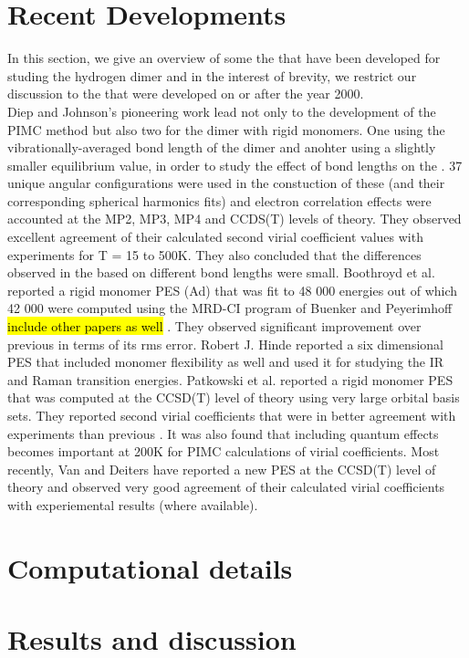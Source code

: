     \section{Recent Developments}
        In this section, we give an overview of some the \abInitio{} \PESs{} that have been developed for studing the hydrogen dimer and in the interest of brevity, we restrict our discussion to the \PESs{} that were developed on or after the year 2000.\\
 
        Diep and Johnson's \cite{Diep2000} pioneering work lead not only to the development of the PIMC method but also two \abInitio{} \PESs{} for the dimer with rigid monomers. One using the vibrationally-averaged bond length of the dimer and anohter using a slightly smaller equilibrium value, in order to study the effect of bond lengths on the \PESs{}. 37 unique angular configurations were used in the constuction of these \PESs{} (and their corresponding spherical harmonics fits) and electron correlation effects were accounted at the MP2, MP3, MP4 and CCDS(T) levels of theory. They observed excellent agreement of their calculated second virial coefficient values with experiments for T = 15 to 500K. They also concluded that the differences observed in the \PESs{} based on different bond lengths were small. Boothroyd et al. \cite{Boothroyd2002} reported a rigid monomer PES (Ad) that was fit to \Sim{} 48 000 \abInitio{} energies out of which \Sim{} 42 000 were computed using the MRD-CI program of Buenker and Peyerimhoff \hl{include other papers as well} \cite{Buenker1974}. They observed significant improvement over previous \PESs{} in terms of its rms error. Robert J. Hinde \cite{Hinde2008} reported a six dimensional PES that included monomer flexibility as well and used it for studying the IR and Raman transition energies. Patkowski et al. \cite{Patkowski2008} reported a rigid monomer PES that was computed at the CCSD(T) level of theory using very large orbital basis sets. They reported second virial coefficients that were in better agreement with experiments than previous \PESs{}. It was also found that including quantum effects becomes important at \Sim{} 200K for PIMC calculations of virial coefficients. Most recently, Van and Deiters \cite{Tat2015} have reported a new \abInitio{} PES at the CCSD(T) level of theory and observed very good agreement of their calculated virial coefficients with experiemental results (where available). 
    \section{Computational details}
    \section{Results and discussion}
